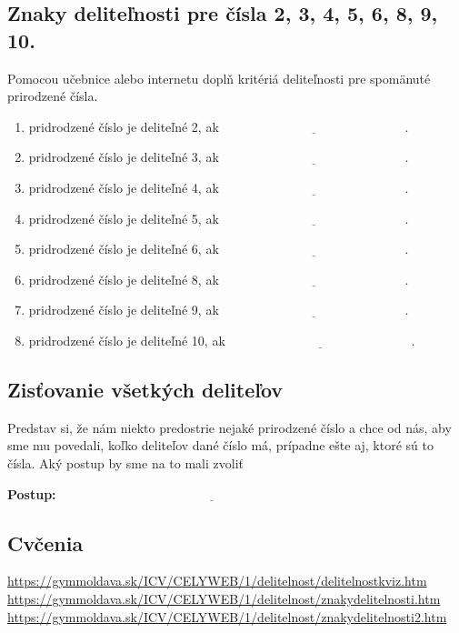 \documentclass[12pt]{article}
\begin{document}
	\subsection{Znaky deliteľnosti pre čísla 2, 3, 4, 5, 6, 8, 9, 10.}
	Pomocou učebnice alebo internetu doplň kritériá deliteľnosti pre spomänuté prirodzené čísla.\\
	
	\begin{enumerate}
		\item pridrodzené číslo je deliteľné 2, ak $\underline{\hspace{6cm}}$.
		\item pridrodzené číslo je deliteľné 3, ak $\underline{\hspace{6cm}}$.
		\item pridrodzené číslo je deliteľné 4, ak $\underline{\hspace{6cm}}$.
		\item pridrodzené číslo je deliteľné 5, ak $\underline{\hspace{6cm}}$.
		\item pridrodzené číslo je deliteľné 6, ak $\underline{\hspace{6cm}}$.
		\item pridrodzené číslo je deliteľné 8, ak $\underline{\hspace{6cm}}$.
		\item pridrodzené číslo je deliteľné 9, ak $\underline{\hspace{6cm}}$.
		\item pridrodzené číslo je deliteľné 10, ak $\underline{\hspace{6cm}}$.
	\end{enumerate}
	
	\subsection{Zisťovanie všetkých deliteľov}
	Predstav si, že nám niekto predostrie nejaké prirodzené číslo a chce od nás, aby sme mu povedali, koľko deliteľov dané číslo má, prípadne ešte aj, ktoré sú to čísla. Aký postup by sme na to mali zvoliť\newline
	
	\textbf{Postup:} $\underline{\hspace{10cm}}$
	\newline
	\subsection{Cvčenia}
	\url{https://gymmoldava.sk/ICV/CELYWEB/1/delitelnost/delitelnostkviz.htm}\\
	\url{https://gymmoldava.sk/ICV/CELYWEB/1/delitelnost/znakydelitelnosti.htm}\\
	\url{https://gymmoldava.sk/ICV/CELYWEB/1/delitelnost/znakydelitelnosti2.htm}
	
\end{document}
